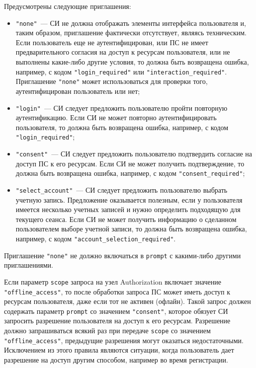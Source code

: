 Предусмотрены следующие приглашения:
%
\begin{itemize}
\item
\lstinline{"none"}~--- 
СИ не должна отображать элементы интерфейса пользователя и, таким образом, 
приглашение фактически отсутствует, являясь техническим.
%
Если пользователь еще не аутентифицирован, или ПС не имеет предварительного
согласия на доступ к ресурсам пользователя, или не выполнены какие-либо другие 
условия, то должна быть возвращена ошибка, например, с кодом 
\lstinline{"login_required"} или \lstinline{"interaction_required"}.
%
Приглашение \lstinline{"none"} может использоваться для проверки того, 
аутентифицирован пользователь или нет;

 
\item
\lstinline{"login"}~--- 
СИ следует предложить пользователю пройти повторную аутентификацию.
%
Если СИ не может повторно аутентифицировать пользователя, то должна быть 
возвращена ошибка, например, с кодом \lstinline{"login_required"};

\item
\lstinline{"consent"}~--- 
СИ следует предложить пользователю подтвердить согласие на доступ ПС к его 
ресурсам. 
%
Если СИ не может получить подтверждение, то должна быть возвращена
ошибка, например, с кодом \lstinline{"consent_required"};

\item
\lstinline{"select_account"}~--- 
СИ следует предложить пользователю выбрать учетную запись.
%
Предложение оказывается полезным, если у пользователя имеется несколько учетных 
записей и нужно определить подходящую для текущего сеанса.
%
Если СИ не может получить информацию о сделанном пользователем выборе 
учетной записи, то должна быть возвращена ошибка, например, с кодом
\lstinline{"account_selection_required"}.
\end{itemize}

Приглашение \lstinline{"none"} не должно включаться в \lstinline{prompt} с 
какими-либо другими приглашениями. 

Если параметр \lstinline{scope} запроса на узел Authorization включает значение
\lstinline{"offline_access"}, то после обработки запроса ПС может иметь
доступ к ресурсам пользователя, даже если тот не активен (офлайн).
%
Такой запрос должен содержать параметр \lstinline{prompt} со значением 
\lstinline{"consent"}, которое обязует СИ запросить разрешение пользователя 
на доступ к его ресурсам. 
%
Разрешение должно запрашиваться всякий раз при передаче \lstinline{scope}
со значением \lstinline{"offline_access"}, предыдущие разрешения могут 
оказаться недостаточными.
%
Исключением из этого правила являются ситуации, когда пользователь дает 
разрешение на доступ другим способом, например во время регистрации.

